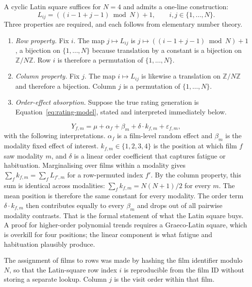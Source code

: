 \documentclass{article}
\begin{document}
A cyclic Latin square suffices for $N = 4$ and admits a one-line construction:
\begin{equation}
L_{ij} = ((i - 1 + j - 1) \bmod N) + 1, \qquad i, j \in \{1, \ldots, N\}.
\label{eq:latin-cyclic}
\end{equation}
Three properties are required, and each follows from elementary number theory.
\begin{enumerate}
    \item \emph{Row property.} Fix $i$. The map $j \mapsto L_{ij}$ is $j \mapsto ((i - 1 + j - 1) \bmod N) + 1$, a bijection on $\{1, \ldots, N\}$ because translation by a constant is a bijection on $\mathbb{Z}/N\mathbb{Z}$. Row $i$ is therefore a permutation of $\{1, \ldots, N\}$.
    \item \emph{Column property.} Fix $j$. The map $i \mapsto L_{ij}$ is likewise a translation on $\mathbb{Z}/N\mathbb{Z}$ and therefore a bijection. Column $j$ is a permutation of $\{1, \ldots, N\}$.
    \item \emph{Order-effect absorption.} Suppose the true rating generation is Equation~\ref{eq:rating-model}, stated and interpreted immediately below.
\end{enumerate}

\begin{equation}
Y_{f,m} = \mu + \alpha_f + \beta_m + \delta \cdot k_{f,m} + \varepsilon_{f,m},
\label{eq:rating-model}
\end{equation}
with the following interpretations. $\alpha_f$ is a film-level random effect and $\beta_m$ is the modality fixed effect of interest. $k_{f,m} \in \{1, 2, 3, 4\}$ is the position at which film $f$ saw modality $m$, and $\delta$ is a linear order coefficient that captures fatigue or habituation. Marginalising over films within a modality gives $\sum_f k_{f,m} = \sum_f L_{f', m}$ for a row-permuted index $f'$. By the column property, this sum is identical across modalities: $\sum_f k_{f,m} = N(N+1)/2$ for every $m$. The mean position is therefore the same constant for every modality. The order term $\delta \cdot k_{f,m}$ then contributes equally to every $\beta_m$ and drops out of all pairwise modality contrasts. That is the formal statement of what the Latin square buys. A proof for higher-order polynomial trends requires a Graeco-Latin square, which is overkill for four positions; the linear component is what fatigue and habituation plausibly produce.

The assignment of films to rows was made by hashing the film identifier modulo $N$, so that the Latin-square row index $i$ is reproducible from the film ID without storing a separate lookup. Column $j$ is the visit order within that film.
\end{document}
